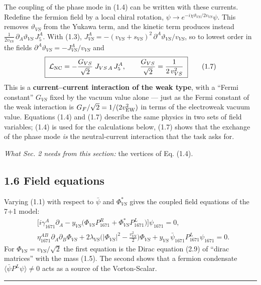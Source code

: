 \documentclass[
  10pt,
]{article}
\begin{document}
The coupling of the phase mode in (1.4) can be written with these
currents. Redefine the fermion field by a local chiral rotation,
\(\psi\to e^{-i\chi\vartheta_{VS}/2v_{VS}}\psi\). This removes
\(\vartheta_{VS}\) from the Yukawa term, and the kinetic term produces
instead \(\frac{1}{2v_{VS}}\,\partial_A\vartheta_{VS}\,J_5^A\). With
(1.3), \(J_{VS}^A=-(v_{VS}+s_{VS})^2\,\partial^A\vartheta_{VS}/v_{VS}\),
so to lowest order in the fields
\(\partial^A\vartheta_{VS}=-J_{VS}^A/v_{VS}\) and
\[\boxed{\;\mathcal L_{\rm NC}=-\frac{G_{VS}}{\sqrt2}\;J_{VS\,A}\,J_5^{A},\qquad\frac{G_{VS}}{\sqrt2}=\frac{1}{2\,v_{VS}^{2}}\;}\tag{1.7}\]
This is a \textbf{current--current interaction of the weak type}, with a
``Fermi constant'' \(G_{VS}\) fixed by the vacuum value alone --- just
as the Fermi constant of the weak interaction is
\(G_F/\sqrt2=1/(2v_{\rm EW}^2)\) in terms of the electroweak vacuum
value. Equations (1.4) and (1.7) describe the same physics in two sets
of field variables; (1.4) is used for the calculations below, (1.7)
shows that the exchange of the phase mode \emph{is} the neutral-current
interaction that the task asks for.

\emph{What Sec. 2 needs from this section:} the vertices of Eq. (1.4).

\hypertarget{field-equations}{%
\subsection{1.6 Field equations}\label{field-equations}}

Varying (1.1) with respect to \(\bar\psi\) and \(\Phi_{VS}^*\) gives the
coupled field equations of the 7+1 model: \[\boxed{\;\begin{aligned}
&\big[i\gamma_{1671}^A\partial_A-y_{VS}\big(\Phi_{VS}P_{1671}^{R}+\Phi_{VS}^{*}P_{1671}^{L}\big)\big]\psi_{1671}=0,\\
&\eta_{1671}^{AB}\partial_A\partial_B\Phi_{VS}+2\lambda_{VS}\Big(|\Phi_{VS}|^2-\frac{v_{VS}^2}{2}\Big)\Phi_{VS}+y_{VS}\,\bar\psi_{1671}P_{1671}^{L}\psi_{1671}=0 .
\end{aligned}\;}\tag{1.8}\] For \(\Phi_{VS}=v_{VS}/\sqrt2\) the first
equation is the Dirac equation (2.9) of ``dirac matrices'' with the mass
(1.5). The second shows that a fermion condensate
\(\langle\bar\psi P^{L}\psi\rangle\ne0\) acts as a source of the
Vorton-Scalar.

\begin{center}\rule{0.5\linewidth}{0.5pt}\end{center}
\end{document}
